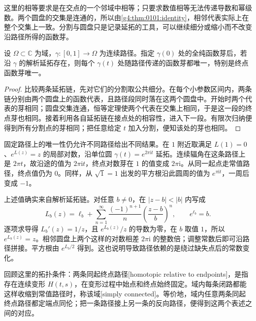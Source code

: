 这里的相等要求是在交点的一个邻域中相等；只要求数值相等无法传递导数和幂级数。两个圆盘的交集是连通的，所以由\cref{g4:thm:0101:identity}，相邻代表实际上在整个交集上一致。分割与圆盘只是记录延拓的工具，可以继续细分或缩小而不改变沿路径所得的函数芽。

\begin{lemma}\label{g4:lem:0102:continuation-unique}
	设 \(\Omega\subset\mathbb C\) 为域，\(\gamma:[0,1]\rightarrow\Omega\) 为连续路径。指定 \(\gamma(0)\) 处的全纯函数芽后，若沿 \(\gamma\) 的解析延拓存在，则每个 \(\gamma(t)\) 处随路径传递的函数芽都唯一，特别是终点函数芽唯一。
\end{lemma}
\begin{proof}
	比较两条延拓链，先对它们的分割取公共细分。在每个小参数区间内，两条链分别由两个圆盘上的函数代表，且路径段同时落在这两个圆盘中。开始时两个代表的芽相同；圆盘交集连通，恒等定理使两个代表在交集上相同，于是这一段的终点芽也相同。接着利用各自延拓链在接点处的相容性，进入下一段。有限次归纳便得到所有分割点的芽相同；把任意给定 \(t\) 加入分割，便知该处的芽也相同。
\end{proof}

固定路径上的唯一性仍允许不同路径给出不同结果。在 \(1\) 附近取满足 \(L(1)=0\)、\(e^{L(z)}=z\) 的局部对数，沿单位圆 \(\gamma(t)=e^{2\pi\mathrm{i}t}\) 延拓。连续辐角在这条路径上是 \(2\pi t\)，故沿途的值为 \(2\pi\mathrm{i}t\)，终点对数芽在 \(1\) 的值变成 \(2\pi\mathrm{i}\)。从同一起点走常值路径，终点值仍为 \(0\)。同样，从 \(\sqrt1=1\) 出发的平方根沿此圆周的值为 \(e^{\pi\mathrm{i}t}\)，一周后变成 \(-1\)。

\ProseParagraphBreak

上述值确实来自解析延拓链。对任意 \(b\neq0\)，在 \(|z-b|<|b|\) 内写成
\[
	L_b(z)=\ell_b+\sum_{n=1}^{\infty}\frac{(-1)^{n+1}}n
	\left(\frac{z-b}{b}\right)^n,\qquad e^{\ell_b}=b.
\]
逐项求导得 \(L_b'(z)=1/z\)，且 \(e^{L_b(z)}/z\) 的导数为零，在 \(b\) 取值 \(1\)，所以 \(e^{L_b(z)}=z\)。相邻圆盘上两个这样的对数相差 \(2\pi\mathrm{i}\) 的整数倍；调整常数后即可沿路径拼接。平方根由 \(e^{L_b/2}\) 得到。这也说明导致路径依赖的是绕过缺失点后的常数变化。

\ProseParagraphBreak

回顾这里的拓扑条件：两条同起终点路径[homotopic relative to endpoints]，是指存在连续变形 \(H(t,s)\)，在变形过程中始点和终点始终固定。域内每条闭路都能这样收缩到常值路径时，称该域[simply connected]。等价地，域内任意两条同起终点路径都定端点同伦；把一条路径接上另一条的反向路径，便得到这两个表述之间的对应。

